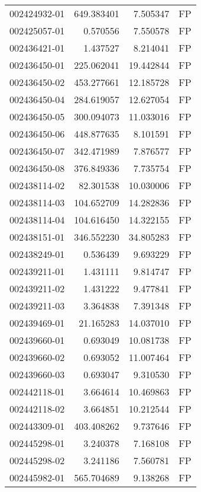 \begin{tabular}{lrrl}
002424932-01 &  649.383401 &       7.505347 &   FP \\
002425057-01 &    0.570556 &       7.550578 &   FP \\
002436421-01 &    1.437527 &       8.214041 &   FP \\
002436450-01 &  225.062041 &      19.442844 &   FP \\
002436450-02 &  453.277661 &      12.185728 &   FP \\
002436450-04 &  284.619057 &      12.627054 &   FP \\
002436450-05 &  300.094073 &      11.033016 &   FP \\
002436450-06 &  448.877635 &       8.101591 &   FP \\
002436450-07 &  342.471989 &       7.876577 &   FP \\
002436450-08 &  376.849336 &       7.735754 &   FP \\
002438114-02 &   82.301538 &      10.030006 &   FP \\
002438114-03 &  104.652709 &      14.282836 &   FP \\
002438114-04 &  104.616450 &      14.322155 &   FP \\
002438151-01 &  346.552230 &      34.805283 &   FP \\
002438249-01 &    0.536439 &       9.693229 &   FP \\
002439211-01 &    1.431111 &       9.814747 &   FP \\
002439211-02 &    1.431222 &       9.477841 &   FP \\
002439211-03 &    3.364838 &       7.391348 &   FP \\
002439469-01 &   21.165283 &      14.037010 &   FP \\
002439660-01 &    0.693049 &      10.081738 &   FP \\
002439660-02 &    0.693052 &      11.007464 &   FP \\
002439660-03 &    0.693047 &       9.310530 &   FP \\
002442118-01 &    3.664614 &      10.469863 &   FP \\
002442118-02 &    3.664851 &      10.212544 &   FP \\
002443309-01 &  403.408262 &       9.737646 &   FP \\
002445298-01 &    3.240378 &       7.168108 &   FP \\
002445298-02 &    3.241186 &       7.560781 &   FP \\
002445982-01 &  565.704689 &       9.138268 &   FP \\

\end{tabular}
